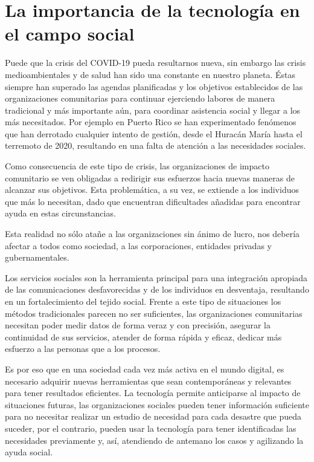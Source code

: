 \section{La importancia de la tecnología en el campo social}
Puede que la crisis del COVID-19 pueda resultarnos nueva, sin embargo las crisis medioambientales y de salud han sido una constante en nuestro planeta. Éstas siempre han superado las agendas planificadas y los objetivos establecidos de las organizaciones comunitarias para continuar ejerciendo labores de manera tradicional y más importante aún, para coordinar asistencia social y llegar a los más necesitados. Por ejemplo en Puerto Rico se han experimentado fenómenos que han derrotado cualquier intento de gestión, desde el Huracán María hasta el terremoto de 2020, resultando en una falta de atención a las necesidades sociales.
\vspace{1em}
\par Como consecuencia de este tipo de crisis, las organizaciones de impacto comunitario se ven obligadas a redirigir sus esfuerzos hacia nuevas maneras de alcanzar sus objetivos. Esta problemática, a su vez, se extiende a los individuos que más lo necesitan, dado que encuentran dificultades añadidas para encontrar ayuda en estas circunstancias.
\vspace{1em}
\par Esta realidad no sólo atañe a las organizaciones sin ánimo de lucro, nos debería afectar a todos como
sociedad, a las corporaciones, entidades privadas y gubernamentales.
\vspace{1em}
\par Los servicios sociales son la herramienta principal para una integración apropiada de las comunicaciones desfavorecidas y de los individuos en desventaja, resultando en un fortalecimiento del tejido social. Frente a este tipo de situaciones los métodos tradicionales parecen no ser suficientes, las organizaciones comunitarias necesitan poder medir datos de forma veraz y con precisión, asegurar la continuidad de sus servicios, atender de forma rápida y eficaz, dedicar más esfuerzo a las personas que a los procesos.
\vspace{1em}
\par Es por eso que en una sociedad cada vez más activa en el mundo digital, es necesario adquirir nuevas herramientas que sean contemporáneas y relevantes para tener resultados eficientes. La tecnología permite anticiparse al impacto de situaciones futuras, las organizaciones sociales pueden tener información suficiente para no necesitar realizar un estudio de necesidad para cada desastre que pueda suceder, por el contrario, pueden usar la tecnología para tener identificadas las necesidades previamente y, así, atendiendo de antemano los casos y agilizando la ayuda social.
